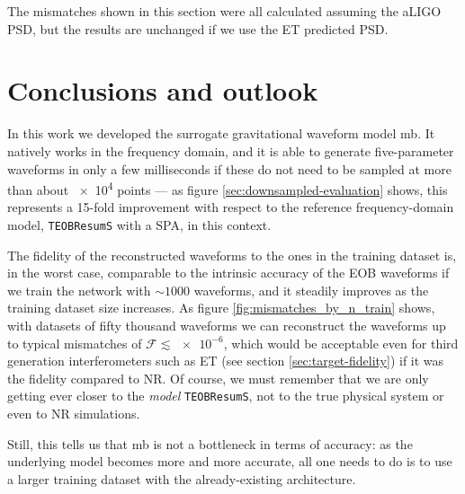 \documentclass[main.tex]{subfiles}
\begin{document}
The mismatches shown in this section were all calculated assuming the \ac{aLIGO} \ac{PSD}, but the results are unchanged if we use the \ac{ET} predicted \ac{PSD}. 


\chapter{Conclusions and outlook}


In this work we developed the surrogate gravitational waveform model \ac{mb}.
It natively works in the frequency domain, and it is able to generate five-parameter waveforms in only a few milliseconds if these do not need to be sampled at more than about \num{e4} points --- as figure \ref{sec:downsampled-evaluation} shows, this represents a 15-fold improvement with respect to the reference frequency-domain model, \texttt{TEOBResumS} with a \ac{SPA}, in this context.

The fidelity of the reconstructed waveforms to the ones in the training dataset is, in the worst case, comparable to the intrinsic accuracy of the \ac{EOB} waveforms if we train the network with \(\sim 1000\) waveforms, and it steadily improves as the training dataset size increases.
As figure \ref{fig:mismatches_by_n_train} shows, with datasets of fifty thousand waveforms we can reconstruct the waveforms up to typical mismatches of \(\mathcal{F} \lesssim \num{e-6}\), which would be acceptable even for third generation interferometers such as \ac{ET} (see section \ref{sec:target-fidelity}) if it was the fidelity compared to \ac{NR}.
Of course, we must remember that we are only getting ever closer to the \emph{model} \texttt{TEOBResumS}, not to the true physical system or even to \ac{NR} simulations.

Still, this tells us that \ac{mb} is not a bottleneck in terms of accuracy: as the underlying model becomes more and more accurate, all one needs to do is to use a larger training dataset with the already-existing architecture.

\end{document}

